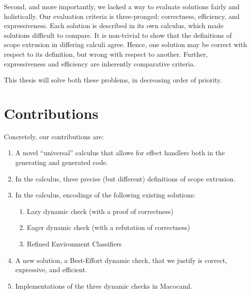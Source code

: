 Second, and more importantly, we lacked a way to evaluate solutions fairly and holistically. Our evaluation criteria is three-pronged: correctness, efficiency, and expressiveness. Each solution is described in its own calculus, which made solutions difficult to compare. It is non-trivial to show that the definitions of scope extrusion in differing calculi agree. Hence, one solution may be correct with respect to its definition, but wrong with respect to another. Further, expressiveness and efficiency are inherently comparative criteria.

This thesis will solve both these problems, in decreasing order of priority. 

\section{Contributions}
Concretely, our contributions are:
\begin{enumerate}
    \item A novel ``universal'' calculus that allows for effect handlers both in the generating and generated code.
    \item In the calculus, three precise (but different) definitions of scope extrusion.  
    \item In the calculus, encodings of the following existing solutions: 
    \begin{enumerate} 
        \item Lazy dynamic check (with a proof of correctness)
        \item Eager dynamic check (with a refutation of correctness)
        \item Refined Environment Classifiers
    \end{enumerate}
    \item A new solution, a Best-Effort dynamic check, that we justify is correct, expressive, and efficient.
    \item Implementations of the three dynamic checks in Macocaml.
\end{enumerate}

